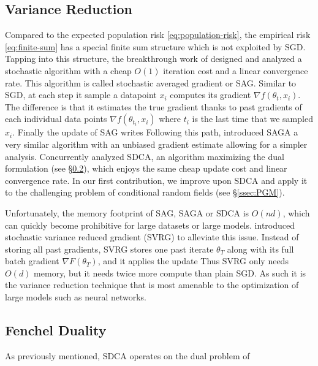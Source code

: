 \subsection{Variance Reduction}
\label{ssec:variance-reduction}
Compared to the expected population risk \cref{eq:population-risk}, the empirical risk \cref{eq:finite-sum} has a special finite sum structure which is not exploited by SGD.
Tapping into this structure, the breakthrough work of \citet{roux2012stochastic} designed and analyzed a stochastic algorithm with a  cheap $O(1)$ iteration cost and a linear convergence rate. 
This algorithm is called stochastic averaged gradient or SAG. 
Similar to SGD, at each step it sample a datapoint $x_i$ computes its gradient $\nabla f(\theta_{t}, x_i)$.
The difference is that it estimates the true gradient thanks to past gradients of each individual data points $\nabla f(\theta_{t_i}, x_i)$ where $t_i$ is the last time that we sampled $x_i$.
Finally the update of SAG writes
Following this path, \citet{defazio2014saga} introduced SAGA a very similar algorithm with an unbiased gradient estimate  allowing for a simpler analysis.
Concurrently \citet{shalev-shwartz_stochastic_2013} analyzed SDCA, an algorithm maximizing the dual formulation (see \S\ref{ssec:fenchel-duality}), which enjoys the same cheap update cost and linear convergence rate.
In our first contribution, we improve upon SDCA and apply it to the challenging problem of conditional random fields (see \S\ref{ssec:PGM}).

Unfortunately, the memory footprint of SAG, SAGA or SDCA is $O(n d)$, which can quickly become prohibitive for large datasets or large models. 
\citet{johnson2013accelerating} introduced stochastic variance reduced gradient (SVRG) to alleviate this issue. 
Instead of storing all past gradients, SVRG stores one past iterate $\theta_T$ along with its full batch gradient $\nabla F(\theta_T)$, and it applies the update
Thus SVRG only needs $O(d)$ memory, but it needs twice more compute than plain SGD. As such it is the variance reduction technique that is most amenable to the optimization of large models such as neural networks.

\subsection{Fenchel Duality}
\label{ssec:fenchel-duality}
As previously mentioned, SDCA operates on the dual problem of 

